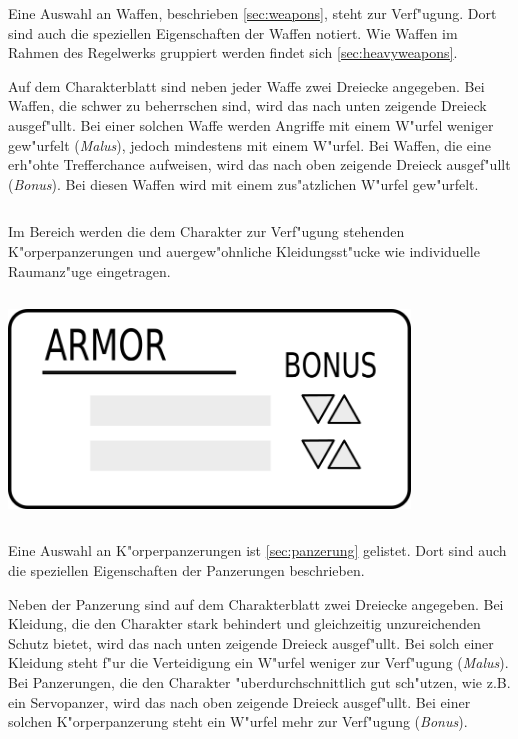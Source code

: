 Eine Auswahl an Waffen, beschrieben \cref{sec:weapons}, steht zur Verf"ugung. Dort sind auch die speziellen Eigenschaften der Waffen notiert. Wie Waffen im Rahmen des Regelwerks gruppiert werden findet sich \cref{sec:heavyweapons}.

Auf dem Charakterblatt sind neben jeder Waffe zwei Dreiecke angegeben. Bei Waffen, die schwer zu beherrschen sind, wird das nach unten zeigende Dreieck ausgef"ullt. Bei einer solchen Waffe werden Angriffe mit einem W"urfel weniger gew"urfelt (\emph{Malus}), jedoch mindestens mit einem W"urfel. Bei Waffen, die eine erh"ohte Trefferchance aufweisen, wird das nach oben zeigende Dreieck ausgef"ullt (\emph{Bonus}). Bei diesen Waffen wird mit einem zus"atzlichen W"urfel gew"urfelt.

\begin{column}[l]{0.55}
    Im Bereich  werden die dem Charakter zur Verf"ugung stehenden K"orperpanzerungen und au\3ergew"ohnliche Kleidungsst"ucke wie individuelle Raumanz"uge eingetragen.
\end{column}
\begin{column}[r]{0.45}
    \centering
    \includegraphics[width=0.80\textwidth]{images/character_armor.png}
\end{column}
\medskip

Eine Auswahl an K"orperpanzerungen ist \cref{sec:panzerung} gelistet. Dort sind auch die speziellen Eigenschaften der Panzerungen beschrieben.

Neben der Panzerung sind auf dem Charakterblatt zwei Dreiecke angegeben. Bei Kleidung, die den Charakter stark behindert und gleichzeitig unzureichenden Schutz bietet, wird das nach unten zeigende Dreieck ausgef"ullt. Bei solch einer Kleidung steht f"ur die Verteidigung ein W"urfel weniger zur Verf"ugung (\emph{Malus}). Bei Panzerungen, die den Charakter "uberdurchschnittlich gut sch"utzen, wie z.B. ein Servopanzer, wird das nach oben zeigende Dreieck ausgef"ullt. Bei einer solchen K"orperpanzerung steht ein W"urfel mehr zur Verf"ugung (\emph{Bonus}).

